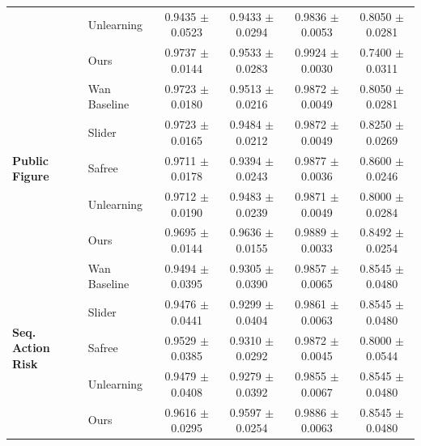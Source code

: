 \documentclass{article}
\begin{document}
\begin{table}[ht]
{\begin{tabular}{ll cccc}
 & Unlearning  \cite{facchiano2025video} & 0.9435 $\pm$ 0.0523 & 0.9433 $\pm$ 0.0294 & 0.9836 $\pm$ 0.0053 & 0.8050 $\pm$ 0.0281 \\
 & Ours         & 0.9737 $\pm$ 0.0144 & 0.9533 $\pm$ 0.0283 & 0.9924 $\pm$ 0.0030 & 0.7400 $\pm$ 0.0311 \\
\midrule
\multirow{5}{*}{\textbf{Public Figure}} 
 & Wan Baseline & 0.9723 $\pm$ 0.0180 & 0.9513 $\pm$ 0.0216 & 0.9872 $\pm$ 0.0049 & 0.8050 $\pm$ 0.0281 \\
 & Slider \cite{ekin2026unreasonable}       & 0.9723 $\pm$ 0.0165 & 0.9484 $\pm$ 0.0212 & 0.9872 $\pm$ 0.0049 & 0.8250 $\pm$ 0.0269 \\
 & Safree \cite{yoon2024safree}      & 0.9711 $\pm$ 0.0178 & 0.9394 $\pm$ 0.0243 & 0.9877 $\pm$ 0.0036 & 0.8600 $\pm$ 0.0246 \\
 & Unlearning \cite{facchiano2025video}  & 0.9712 $\pm$ 0.0190 & 0.9483 $\pm$ 0.0239 & 0.9871 $\pm$ 0.0049 & 0.8000 $\pm$ 0.0284 \\
 & Ours         & 0.9695 $\pm$ 0.0144 & 0.9636 $\pm$ 0.0155 & 0.9889 $\pm$ 0.0033 & 0.8492 $\pm$ 0.0254 \\
\midrule
\multirow{5}{*}{\textbf{Seq. Action Risk}} 
 & Wan Baseline & 0.9494 $\pm$ 0.0395 & 0.9305 $\pm$ 0.0390 & 0.9857 $\pm$ 0.0065 & 0.8545 $\pm$ 0.0480 \\
 & Slider \cite{ekin2026unreasonable}       & 0.9476 $\pm$ 0.0441 & 0.9299 $\pm$ 0.0404 & 0.9861 $\pm$ 0.0063 & 0.8545 $\pm$ 0.0480 \\
 & Safree \cite{yoon2024safree}      & 0.9529 $\pm$ 0.0385 & 0.9310 $\pm$ 0.0292 & 0.9872 $\pm$ 0.0045 & 0.8000 $\pm$ 0.0544 \\
 & Unlearning \cite{facchiano2025video}  & 0.9479 $\pm$ 0.0408 & 0.9279 $\pm$ 0.0392 & 0.9855 $\pm$ 0.0067 & 0.8545 $\pm$ 0.0480 \\
 & Ours         & 0.9616 $\pm$ 0.0295 & 0.9597 $\pm$ 0.0254 & 0.9886 $\pm$ 0.0063 & 0.8545 $\pm$ 0.0480 \\
\bottomrule
\end{tabular}%
}
\end{table}
\end{document}
